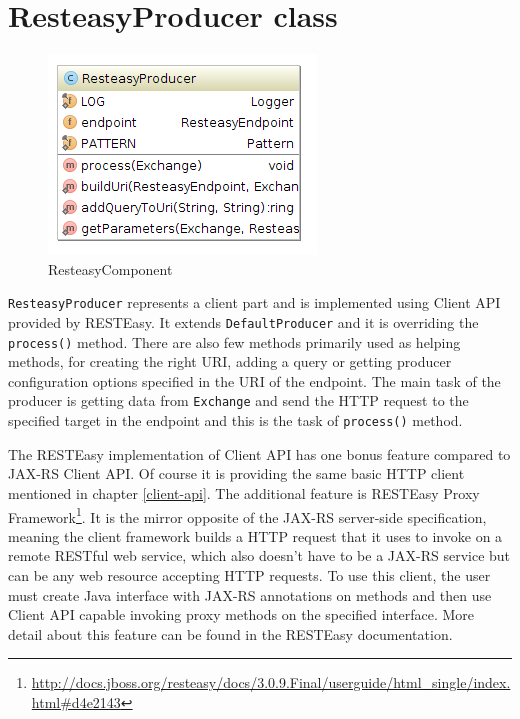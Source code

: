 \documentclass[12pt,final,oneside]{fithesis2}
\begin{document}
\section{ResteasyProducer class}\label{producer}
\begin{figure}[!h]
\centering
\includegraphics[width=0.6\linewidth]{images/producer.png}
\caption{ResteasyComponent}
\label{comp}
\end{figure}

\texttt{ResteasyProducer} represents a client part and is implemented using Client API provided by RESTEasy. It extends \texttt{DefaultProducer} and it is overriding the \texttt{process()} method. There are also few methods  primarily used as helping methods, for creating the right URI, adding a query or getting producer configuration options specified in the URI of the endpoint. The main task of the producer is getting data from \texttt{Exchange} and send the HTTP request to the specified target in the endpoint and this is the task of \texttt{process()} method. 

The RESTEasy implementation of Client API has one bonus feature compared to JAX-RS Client API. Of course it is providing the same basic HTTP client mentioned in chapter \ref{client-api}. The additional feature is RESTEasy Proxy Framework\footnote{\url{http://docs.jboss.org/resteasy/docs/3.0.9.Final/userguide/html_single/index.html\#d4e2143}}. It is the mirror opposite of the JAX-RS server-side specification, meaning the client framework builds a HTTP request that it uses to invoke on a remote RESTful web service, which also doesn't have to be a JAX-RS service but can be any web resource accepting HTTP requests. To use this client, the user must create Java interface with JAX-RS annotations on methods and then use Client API capable invoking proxy methods on the specified interface\cite{resteasy-doc}. More detail about this feature can be found in the RESTEasy documentation. 
\end{document}
